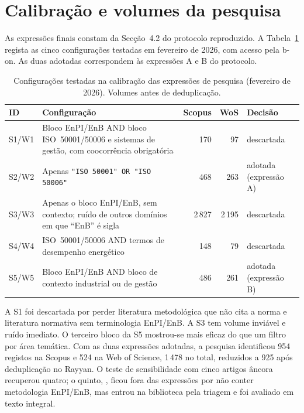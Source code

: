 \section{Calibração e volumes da pesquisa}
\label{sec:apA-pesquisa}

As expressões finais constam da Secção~4.2 do protocolo reproduzido. A Tabela~\ref{tab:apA-calibracao} regista as cinco configurações testadas em fevereiro de 2026, com acesso pela b-on. As duas adotadas correspondem às expressões A e B do protocolo.

\begin{table}[H]
\centering\small
\caption{Configurações testadas na calibração das expressões de pesquisa (fevereiro de 2026). Volumes antes de deduplicação.}
\label{tab:apA-calibracao}
\begin{tabularx}{\linewidth}{@{}l>{\raggedright\arraybackslash}Xrrl@{}}
\toprule
ID & Configuração & Scopus & WoS & Decisão \\
\midrule
S1/W1 & Bloco EnPI/EnB AND bloco ISO~50001/50006 e sistemas de gestão, com coocorrência obrigatória & 170 & 97 & descartada \\
S2/W2 & Apenas \texttt{"ISO 50001" OR "ISO 50006"} & 468 & 263 & adotada (expressão A) \\
S3/W3 & Apenas o bloco EnPI/EnB, sem contexto; ruído de outros domínios em que ``EnB'' é sigla & 2\,827 & 2\,195 & descartada \\
S4/W4 & ISO~50001/50006 AND termos de desempenho energético & 148 & 79 & descartada \\
S5/W5 & Bloco EnPI/EnB AND bloco de contexto industrial ou de gestão & 486 & 261 & adotada (expressão B) \\
\bottomrule
\end{tabularx}
\end{table}

A S1 foi descartada por perder literatura metodológica que não cita a norma e literatura normativa sem terminologia EnPI/EnB. A S3 tem volume inviável e ruído imediato. O terceiro bloco da S5 mostrou-se mais eficaz do que um filtro por área temática. Com as duas expressões adotadas, a pesquisa identificou 954 registos na Scopus e 524 na Web of Science, 1\,478 no total, reduzidos a 925 após deduplicação no Rayyan. O teste de sensibilidade com cinco artigos âncora recuperou quatro; o quinto, \textcite{Karcher2015}, ficou fora das expressões por não conter metodologia EnPI/EnB, mas entrou na biblioteca pela triagem e foi avaliado em texto integral.

